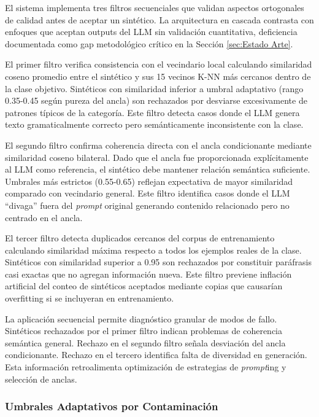 El sistema implementa tres filtros secuenciales que validan aspectos ortogonales de calidad antes de aceptar un sintético. La arquitectura en cascada contrasta con enfoques que aceptan outputs del LLM sin validación cuantitativa, deficiencia documentada como gap metodológico crítico en la Sección \ref{sec:Estado Arte}.

El primer filtro verifica consistencia con el vecindario local calculando similaridad coseno promedio entre el sintético y sus 15 vecinos K-NN más cercanos dentro de la clase objetivo. Sintéticos con similaridad inferior a umbral adaptativo (rango 0.35-0.45 según pureza del ancla) son rechazados por desviarse excesivamente de patrones típicos de la categoría. Este filtro detecta casos donde el LLM genera texto gramaticalmente correcto pero semánticamente inconsistente con la clase.

El segundo filtro confirma coherencia directa con el ancla condicionante mediante similaridad coseno bilateral. Dado que el ancla fue proporcionada explícitamente al LLM como referencia, el sintético debe mantener relación semántica suficiente. Umbrales más estrictos (0.55-0.65) reflejan expectativa de mayor similaridad comparado con vecindario general. Este filtro identifica casos donde el LLM ``divaga'' fuera del \textit{prompt} original generando contenido relacionado pero no centrado en el ancla.

El tercer filtro detecta duplicados cercanos del corpus de entrenamiento calculando similaridad máxima respecto a todos los ejemplos reales de la clase. Sintéticos con similaridad superior a 0.95 son rechazados por constituir paráfrasis casi exactas que no agregan información nueva. Este filtro previene inflación artificial del conteo de sintéticos aceptados mediante copias que causarían overfitting si se incluyeran en entrenamiento.

La aplicación secuencial permite diagnóstico granular de modos de fallo. Sintéticos rechazados por el primer filtro indican problemas de coherencia semántica general. Rechazo en el segundo filtro señala desviación del ancla condicionante. Rechazo en el tercero identifica falta de diversidad en generación. Esta información retroalimenta optimización de estrategias de \textit{prompt}ing y selección de anclas.

\subsubsection*{Umbrales Adaptativos por Contaminación}

